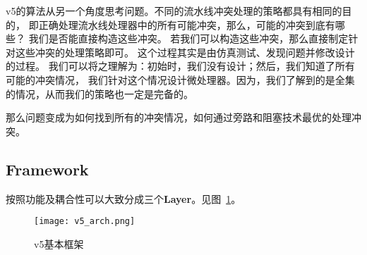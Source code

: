 \documentclass[hyperref,UTF8]{ctexart}
\theoremstyle{definition}
\theoremstyle{remark}
\numberwithin{equation}{subsection}
\newcommand{\Emph}{\textbf}
\begin{document}
	v5的算法从另一个角度思考问题。不同的流水线冲突处理的策略都具有相同的目的，
	即正确处理流水线处理器中的所有可能冲突，那么，可能的冲突到底有哪些？
	我们是否能直接构造这些冲突。
	若我们可以构造这些冲突，那么直接制定针对这些冲突的处理策略即可。
	这个过程其实是由仿真测试、发现问题并修改设计的过程。
	我们可以将之理解为：初始时，我们没有设计；然后，我们知道了所有可能的冲突情况，
	我们针对这个情况设计微处理器。因为，我们了解到的是全集的情况，从而我们的策略也一定是完备的。
	
	那么问题变成为如何找到所有的冲突情况，如何通过旁路和阻塞技术最优的处理冲突。

	
\subsection{Framework}

	按照功能及耦合性可以大致分成三个\Emph{Layer}。见图~\ref{fig:v5_architecture}。
	\begin{figure}[H]
	\centering
	\texttt{[image: v5\_arch.png]}
    \caption{v5基本框架}
	\label{fig:v5_architecture}
	\end{figure}
	
\end{document}
